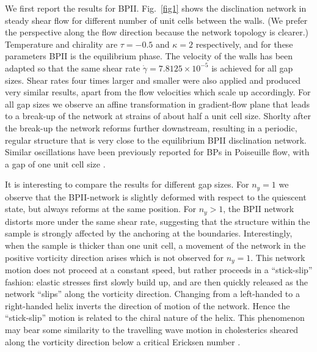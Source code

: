 \documentclass[12pt,twoside]{iopart}
\newcommand{\ex}[1]{\times10^{#1}}
\begin{document}
We first report the results for BPII.
Fig.~\ref{fig1} shows the disclination network in steady shear flow for different number of unit cells between the walls.
(We prefer the perspective along the flow direction because the network topology is clearer.)
Temperature and chirality are $\tau=-0.5$ and $\kappa=2$ respectively, and for these parameters BPII is the equilibrium phase.
The velocity of the walls has been adapted so that the same shear rate $\dot{\gamma}=7.8125\ex{-5}$ is achieved for all gap sizes.
Shear rates four times larger and smaller were also applied and produced very similar results, apart from the flow velocities which scale up accordingly.
For all gap sizes we observe an affine transformation in gradient-flow plane that leads to a break-up of the network at strains of about half a unit cell size.
Shorlty after the break-up the network reforms further downstream, resulting in a periodic, regular structure that is very close to the equilibrium
BPII disclination network. Similar oscillations have been previously reported for
BPs in Poiseuille flow, with a gap of one unit cell size \cite{Dupuis:2005}.

It is interesting to compare the results for different gap sizes.
For $n_y=1$ we observe that the BPII-network is slightly deformed with
respect to the quiescent state, but always reforms at the same position.
For $n_y > 1$, the BPII network distorts more under the same shear rate, 
suggesting that the structure within the sample is strongly affected by
the anchoring at the boundaries.
Interestingly, when the sample is thicker than one unit cell, a movement
of the network in the positive vorticity direction arises
which is not observed for $n_y=1$.
This network motion does not proceed at a constant speed, but rather
proceeds in a ``stick-slip'' fashion: elastic stresses first slowly build up,
and are then quickly released as the network ``slips'' along the vorticity
direction. Changing from a left-handed to a right-handed helix inverts the
direction of motion of the network.
Hence the ``stick-slip'' motion is related to the chiral nature of the helix.
This phenomenon may bear some similarity to the travelling wave motion in
cholesterics sheared along the vorticity direction 
below a critical Ericksen number \cite{Rey:1996a, Rey:1996b}.
\end{document}
